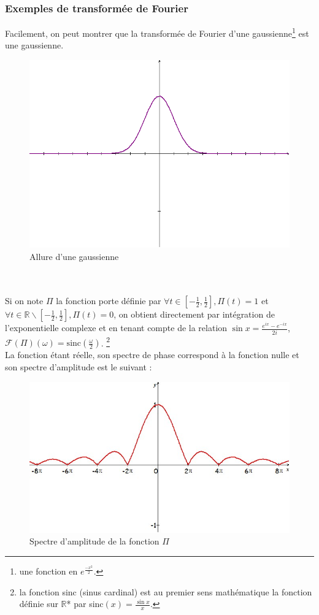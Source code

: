 \subsubsection{Exemples de transformée de Fourier}

Facilement, on peut montrer que la transformée de Fourier d'une gaussienne\footnote{une fonction en $e^{\frac{-x^2}{2}}$.} est une gaussienne.
\begin{figure}[!h]
\centering
\includegraphics[scale=0.3]{images/gaussienne.png}
\caption{Allure d'une gaussienne}
\end{figure} \\ \\

Si on note $\Pi$ la fonction porte définie par 
$\forall t\in \left[-\frac{1}{2},\frac{1}{2} \right],\Pi(t)=1$ et $\forall t\in \mathbb{R} \backslash \left[-\frac{1}{2},\frac{1}{2} \right],\Pi(t)=0$, on obtient directement par intégration de l'exponentielle complexe et en tenant compte de la relation $\sin x = \displaystyle\frac{e^{ix}-e^{-ix}}{2i}$,
$\mathcal{F}(\Pi)(\omega) = \mathrm{sinc}(\frac{\omega}{2})$.  \footnote{la fonction sinc (sinus cardinal) est au premier sens mathématique la fonction définie sur $\mathbb{R}$* par sinc$(x)=\frac{\sin x}{x}$.} \\ La fonction étant réelle, son spectre de phase correspond à la fonction nulle et son spectre d'amplitude est le suivant : 
\begin{figure}[!h]
\centering
\includegraphics[scale=0.5]{images/sinc.jpg}
\caption{Spectre d'amplitude de la fonction $\Pi$}
\end{figure}


